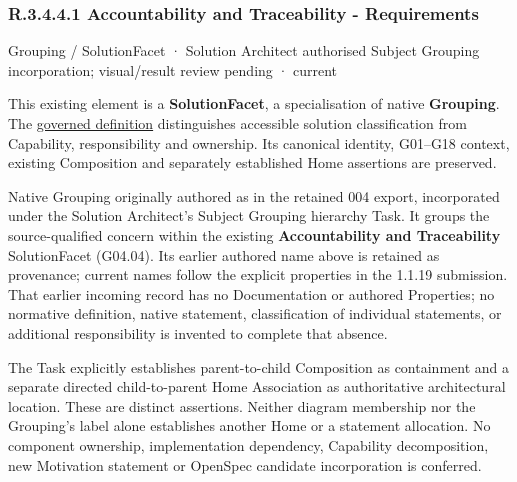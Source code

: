 \subsubsection*{R.3.4.4.1 Accountability and Traceability - Requirements}
\label{navigation:R.3.4.4.1}

\label{element:b12837a817d14919b5c33b35e3bb3d5a}
{\small Grouping / SolutionFacet · Solution Architect authorised Subject Grouping incorporation; visual/result review pending · current}\par

This existing element is a \textbf{SolutionFacet}, a specialisation of native
\textbf{Grouping}. The \href{\detokenize{../../../../../../../governance/continuum-representation.md#solutionfacet-classification--1119-candidate}}{governed definition}
distinguishes accessible solution classification from Capability, responsibility
and ownership. Its canonical identity, G01–G18 context, existing Composition
and separately established Home assertions are preserved.



Native Grouping originally authored as \texttt{} in the retained 004 export,
incorporated under the Solution Architect's Subject Grouping hierarchy Task.
It groups the source-qualified \texttt{} concern within
the existing \textbf{Accountability and Traceability} SolutionFacet (G04.04). Its earlier authored name above is retained as provenance; current names
follow the explicit properties in the 1.1.19 submission.
That earlier incoming record has no Documentation or authored Properties; no normative
definition, native statement, classification of individual statements, or
additional responsibility is invented to complete that absence.



The Task explicitly establishes parent-to-child Composition as containment and
a separate directed child-to-parent Home Association as authoritative architectural
location. These are distinct assertions. Neither diagram membership nor the
Grouping's label alone establishes another Home or a statement allocation.
No component ownership, implementation dependency, Capability decomposition,
new Motivation statement or OpenSpec candidate incorporation is conferred.



